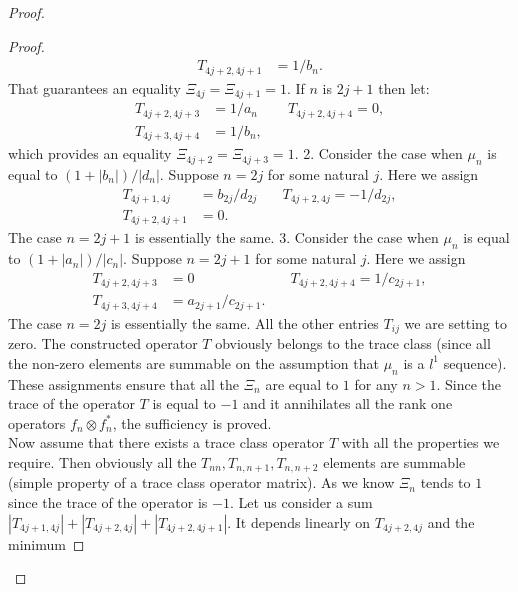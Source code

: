 \documentclass[12pt]{article}
\theoremstyle{definition}
\numberwithin{remark}{section}
\numberwithin{theorem}{section}
\numberwithin{prop}{section}
\numberwithin{equation}{section}
\numberwithin{lemma}{section}
\numberwithin{prop_under_lemma}{lemma}
\begin{document}
\begin{proof}
\begin{proof}
\begin{align*}
                T_{4j+2,4j+1}&=1/b_n.
            \end{align*}
            That guarantees an equality $\Xi_{4j} = \Xi_{4j+1} = 1$.
            If $n$ is $2j+1$ then let:
            \begin{align*}
                T_{4j+2,4j+3}&=1/a_n & \quad T_{4j+2,4j+4} = 0,\\
                T_{4j+3,4j+4}&=1/b_n,
            \end{align*}
            which provides an equality $\Xi_{4j+2} = \Xi_{4j+3} = 1$.
            2. Consider the case when $\mu_n$ is equal to $(1 + |b_n|)/|d_n|$. 
            Suppose $n = 2j$ for some natural $j$.
            Here we assign
            \begin{align*}
                T_{4j+1,4j} &= b_{2j}/d_{2j} & \quad T_{4j+2,4j} = -1/d_{2j},\\
                T_{4j+2,4j+1} &= 0.
            \end{align*}
            The case $n = 2j + 1$ is essentially the same.
            3. Consider the case when $\mu_n$ is equal to $(1 + |a_n|)/|c_n|$. 
            Suppose $n = 2j + 1$ for some natural $j$.
            Here we assign
            \begin{align*}
                T_{4j+2,4j+3} &= 0 & \quad T_{4j+2,4j+4} = 1/c_{2j+1},\\
                T_{4j+3,4j+4} &= a_{2j+1}/c_{2j+1}.
            \end{align*}
            The case $n = 2j$ is essentially the same.
            All the other entries $T_{ij}$ we are setting to zero.
            The constructed operator $T$ obviously belongs to the trace class (since all the non-zero elements are summable 
            on the assumption that $\mu_n$ is a $l^1$ sequence).
            These assignments ensure that all the $\Xi_n$ are equal to $1$ for any $n > 1$.
            Since the trace of the operator $T$ is equal to
            $-1$ and it annihilates all the rank one operators $f_n \otimes f^*_n$, the sufficiency is proved.
            \medskip\\
            Now assume that there exists a trace class operator $T$ with all the properties we require.
            Then obviously all the $T_{nn}, T_{n, n+1}, T_{n, n+2}$ elements are summable (simple property of
            a trace class operator matrix).
            As we know $\Xi_n$ tends to $1$ since the trace of the operator is $-1$. Let us consider a sum
            $|T_{4j+1, 4j}| + |T_{4j+2,4j}| + |T_{4j+2,4j+1}|$. It depends linearly on $T_{4j+2, 4j}$ and the minimum

\end{proof}
\end{proof}
\end{document}
